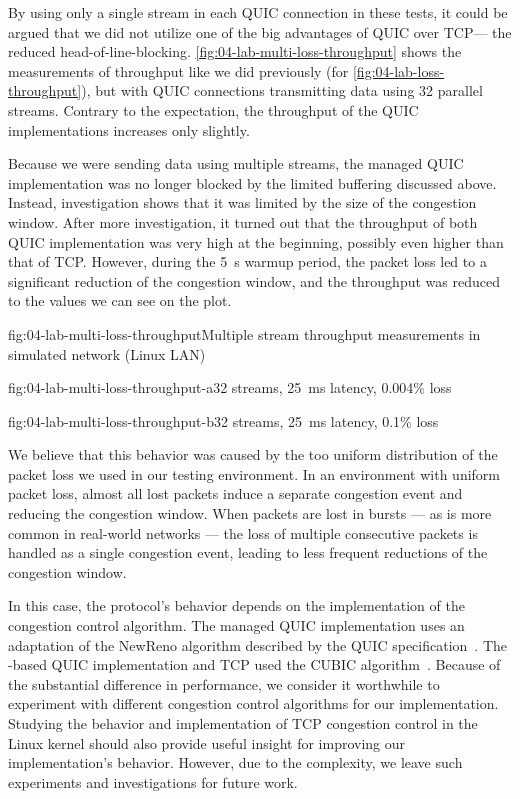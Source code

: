 By using only a single stream in each QUIC connection in these tests, it could be argued that we did
not utilize one of the big advantages of QUIC over TCP\@ --- the reduced \gls{head-of-line-blocking}.
\autoref{fig:04-lab-multi-loss-throughput} shows the measurements of throughput like we did
previously (for \autoref{fig:04-lab-loss-throughput}), but with QUIC connections transmitting data
using 32 parallel streams. Contrary to the expectation, the throughput of the QUIC implementations
increases only slightly.

Because we were sending data using multiple streams, the managed QUIC implementation was no longer
blocked by the limited buffering discussed above. Instead, investigation shows that it was limited
by the size of the congestion window. After more investigation, it turned out that the throughput of
both QUIC implementation was very high at the beginning, possibly even higher than that of TCP\@.
However, during the \SI{5}{\second} warmup period, the packet loss led to a significant reduction of
the congestion window, and the throughput was reduced to the values we can see on the plot.

\begin{myFigure}{fig:04-lab-multi-loss-throughput}{Multiple stream throughput measurements in simulated network (Linux LAN)}
\begin{mySubfigure}{0.49\linewidth}{fig:04-lab-multi-loss-throughput-a}{32 streams, \SI{25}{\milli\second} latency, 0.004\% loss}
\footnotesize

\end{mySubfigure}
\begin{mySubfigure}{0.49\linewidth}{fig:04-lab-multi-loss-throughput-b}{32 streams, \SI{25}{\milli\second} latency, 0.1\% loss}
\footnotesize

\end{mySubfigure}
\end{myFigure}

We believe that this behavior was caused by the too uniform distribution of the packet loss we used
in our testing environment. In an environment with uniform packet loss, almost all lost packets
induce a separate congestion event and reducing the congestion window. When packets are lost in
bursts --- as is more common in real-world networks --- the loss of multiple consecutive packets is
handled as a single congestion event, leading to less frequent reductions of the congestion window.

In this case, the protocol's behavior depends on the implementation of the congestion control
algorithm. The managed QUIC implementation uses an adaptation of the NewReno algorithm described by
the QUIC specification~\autocite[Section~7]{draft-ietf-quic-recovery}. The \libmsquic{}-based QUIC
implementation and TCP used the CUBIC algorithm~\cite{rfc8312}. Because of the substantial
difference in performance, we consider it worthwhile to experiment with different congestion control
algorithms for our implementation. Studying the behavior and implementation of TCP congestion
control in the Linux kernel should also provide useful insight for improving our implementation's
behavior. However, due to the complexity, we leave such experiments and investigations for future
work.

